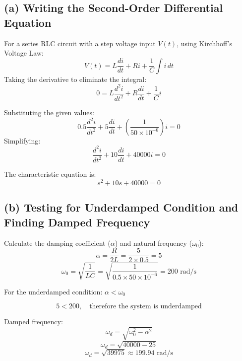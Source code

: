 \documentclass[12pt]{article}
\begin{document}
	\subsection*{(a) Writing the Second-Order Differential Equation}
	For a series RLC circuit with a step voltage input $V(t)$, using Kirchhoff's Voltage Law:
	\begin{equation}
		V(t) = L \frac{di}{dt} + Ri + \frac{1}{C} \int i \, dt
	\end{equation}
	Taking the derivative to eliminate the integral:
	\begin{equation}
		0 = L \frac{d^2 i}{dt^2} + R \frac{di}{dt} + \frac{1}{C} i
	\end{equation}
	
	Substituting the given values:
	\begin{equation}
		0.5 \frac{d^2 i}{dt^2} + 5 \frac{di}{dt} + \left( \frac{1}{50 \times 10^{-6}} \right) i = 0
	\end{equation}
	Simplifying:
	\begin{equation}
		\frac{d^2 i}{dt^2} + 10 \frac{di}{dt} + 40000 i = 0
	\end{equation}
	
	The characteristic equation is:
	\begin{equation}
		s^2 + 10s + 40000 = 0
	\end{equation}
	
	\subsection*{(b) Testing for Underdamped Condition and Finding Damped Frequency}
	Calculate the damping coefficient ($\alpha$) and natural frequency ($\omega_0$):
	\begin{equation}
		\alpha = \frac{R}{2L} = \frac{5}{2 \times 0.5} = 5
	\end{equation}
	\begin{equation}
		\omega_0 = \sqrt{\frac{1}{LC}} = \sqrt{\frac{1}{0.5 \times 50 \times 10^{-6}}} = 200 \text{ rad/s}
	\end{equation}
	
	For the underdamped condition: $\alpha < \omega_0$

	\begin{equation}
		5 < 200, \quad \text{therefore the system is underdamped}
	\end{equation}
	
	Damped frequency:
	\begin{equation}
		\omega_d = \sqrt{\omega_0^2 - \alpha^2}
	\end{equation}
	\begin{equation}
		\omega_d = \sqrt{40000 - 25}
	\end{equation}
	\begin{equation}
		\omega_d = \sqrt{39975} \approx 199.94 \text{ rad/s}
	\end{equation}
	
\end{document}
